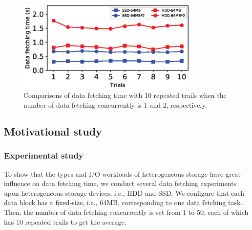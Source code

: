\documentclass[conference]{IEEEtran}
\begin{document}
\begin{figure}[!t]
	\centering
	\includegraphics[height=1.8in]{fig_motivation7.eps}
	\caption{Comparisons of data fetching time with 10 repeated trails when the number of data fetching concurrently is 1 and 2, respectively.}
	\label{Fig:motivation1}
	\vspace{-0.4cm}
\end{figure} 

\subsection{Motivational study}\label{motivational_study}



\subsubsection{Experimental study}  
To show that the types and I/O workloads of heterogeneous storage have great influence on data fetching time, we conduct several data fetching experiments upon heterogeneous storage devices, i.e., HDD and SSD. We configure that each data block has a fixed-size, i.e., 64MB, corresponding to one data fetching task. 
Then, the number of data fetching concurrently is set from 1 to 50, each of which has 10 repeated trails to get the average. 
\end{document}
